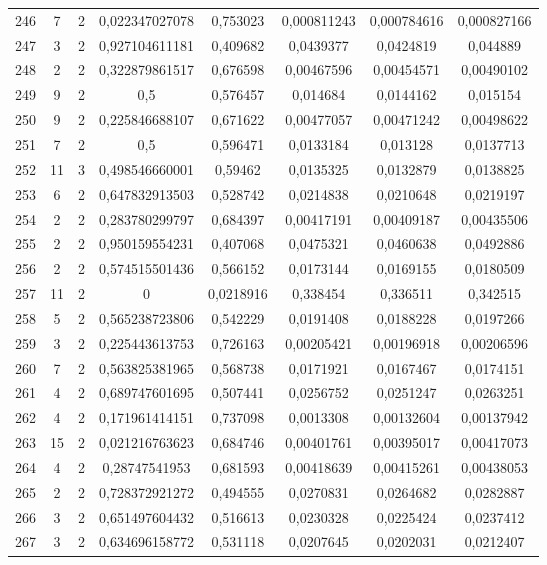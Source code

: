 \begin{longtable}{|c|c|c|c|c|c|c|c|}
246 & 7 & 2 & 0,022347027078 & 0,753023 & 0,000811243 & 0,000784616 & 0,000827166  \\
247 & 3 & 2 & 0,927104611181 & 0,409682 & 0,0439377 & 0,0424819 & 0,044889  \\
248 & 2 & 2 & 0,322879861517 & 0,676598 & 0,00467596 & 0,00454571 & 0,00490102  \\
249 & 9 & 2 & 0,5 & 0,576457 & 0,014684 & 0,0144162 & 0,015154  \\
250 & 9 & 2 & 0,225846688107 & 0,671622 & 0,00477057 & 0,00471242 & 0,00498622  \\
251 & 7 & 2 & 0,5 & 0,596471 & 0,0133184 & 0,013128 & 0,0137713  \\
252 & 11 & 3 & 0,498546660001 & 0,59462 & 0,0135325 & 0,0132879 & 0,0138825  \\
253 & 6 & 2 & 0,647832913503 & 0,528742 & 0,0214838 & 0,0210648 & 0,0219197  \\
254 & 2 & 2 & 0,283780299797 & 0,684397 & 0,00417191 & 0,00409187 & 0,00435506  \\
255 & 2 & 2 & 0,950159554231 & 0,407068 & 0,0475321 & 0,0460638 & 0,0492886  \\
256 & 2 & 2 & 0,574515501436 & 0,566152 & 0,0173144 & 0,0169155 & 0,0180509  \\
257 & 11 & 2 & 0 & 0,0218916 & 0,338454 & 0,336511 & 0,342515  \\
258 & 5 & 2 & 0,565238723806 & 0,542229 & 0,0191408 & 0,0188228 & 0,0197266  \\
259 & 3 & 2 & 0,225443613753 & 0,726163 & 0,00205421 & 0,00196918 & 0,00206596  \\
260 & 7 & 2 & 0,563825381965 & 0,568738 & 0,0171921 & 0,0167467 & 0,0174151  \\
261 & 4 & 2 & 0,689747601695 & 0,507441 & 0,0256752 & 0,0251247 & 0,0263251  \\
262 & 4 & 2 & 0,171961414151 & 0,737098 & 0,0013308 & 0,00132604 & 0,00137942  \\
263 & 15 & 2 & 0,021216763623 & 0,684746 & 0,00401761 & 0,00395017 & 0,00417073  \\
264 & 4 & 2 & 0,28747541953 & 0,681593 & 0,00418639 & 0,00415261 & 0,00438053  \\
265 & 2 & 2 & 0,728372921272 & 0,494555 & 0,0270831 & 0,0264682 & 0,0282887  \\
266 & 3 & 2 & 0,651497604432 & 0,516613 & 0,0230328 & 0,0225424 & 0,0237412  \\
267 & 3 & 2 & 0,634696158772 & 0,531118 & 0,0207645 & 0,0202031 & 0,0212407  \\

\end{longtable}
